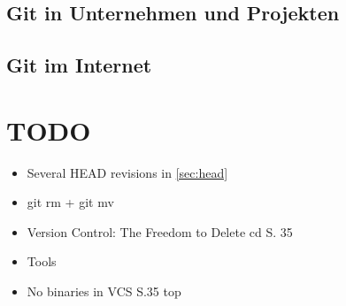 \section{Git in Unternehmen und Projekten}
\section{Git im Internet}
\chapter{\result}\label{cha:result}

\chapter{TODO}
\begin{itemize}
\item Several HEAD revisions in \ref{sec:head}
\item git rm + git mv
\item Version Control: The Freedom to Delete cd S. 35
\item Tools
\item No binaries in VCS S.35 top
\end{itemize}
